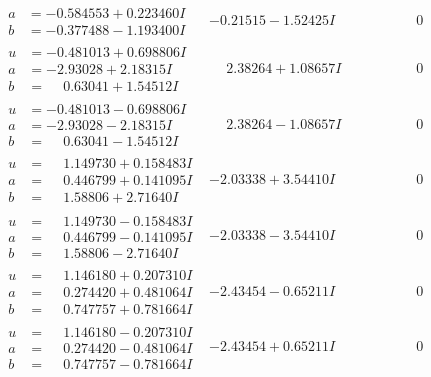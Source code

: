 \documentclass[1p]{elsarticle_modified}
\theoremstyle{definition}
\begin{document}
$$\begin{array}{c|c|c}
\begin{aligned}
a &= -0.584553 + 0.223460 I \\
b &= -0.377488 - 1.193400 I\end{aligned}
 & -0.21515 - 1.52425 I & \phantom{-0.000000 } 0 \\ \hline\begin{aligned}
u &= -0.481013 + 0.698806 I \\
a &= -2.93028 + 2.18315 I \\
b &= \phantom{-}0.63041 + 1.54512 I\end{aligned}
 & \phantom{-}2.38264 + 1.08657 I & \phantom{-0.000000 } 0 \\ \hline\begin{aligned}
u &= -0.481013 - 0.698806 I \\
a &= -2.93028 - 2.18315 I \\
b &= \phantom{-}0.63041 - 1.54512 I\end{aligned}
 & \phantom{-}2.38264 - 1.08657 I & \phantom{-0.000000 } 0 \\ \hline\begin{aligned}
u &= \phantom{-}1.149730 + 0.158483 I \\
a &= \phantom{-}0.446799 + 0.141095 I \\
b &= \phantom{-}1.58806 + 2.71640 I\end{aligned}
 & -2.03338 + 3.54410 I & \phantom{-0.000000 } 0 \\ \hline\begin{aligned}
u &= \phantom{-}1.149730 - 0.158483 I \\
a &= \phantom{-}0.446799 - 0.141095 I \\
b &= \phantom{-}1.58806 - 2.71640 I\end{aligned}
 & -2.03338 - 3.54410 I & \phantom{-0.000000 } 0 \\ \hline\begin{aligned}
u &= \phantom{-}1.146180 + 0.207310 I \\
a &= \phantom{-}0.274420 + 0.481064 I \\
b &= \phantom{-}0.747757 + 0.781664 I\end{aligned}
 & -2.43454 - 0.65211 I & \phantom{-0.000000 } 0 \\ \hline\begin{aligned}
u &= \phantom{-}1.146180 - 0.207310 I \\
a &= \phantom{-}0.274420 - 0.481064 I \\
b &= \phantom{-}0.747757 - 0.781664 I\end{aligned}
 & -2.43454 + 0.65211 I & \phantom{-0.000000 } 0 \\ \hline\begin{aligned}

\end{aligned}
\end{array}$$
\end{document}
